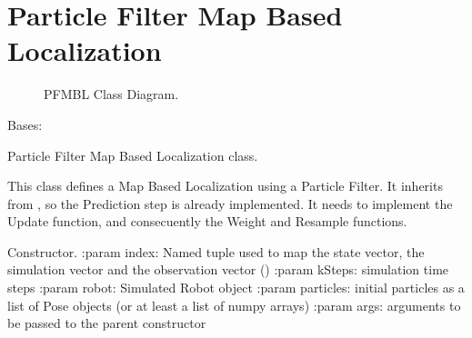 \documentclass[letterpaper,10pt,english]{sphinxmanual}
\begin{document}
\section{Particle Filter Map Based Localization}
\label{\detokenize{particle_filter:particle-filter-map-based-localization}}
\begin{figure}[htbp]
\centering
\capstart

\noindent{}
\caption{PFMBL Class Diagram.}\label{\detokenize{particle_filter:id3}}\end{figure}

\begin{fulllineitems}
\label{\detokenize{particle_filter:PFMBLocalization.PFMBL}}
\sphinxAtStartPar
Bases: {\hyperref[\detokenize{particle_filter:MCLocalization.MCLocalization}]{}}

\sphinxAtStartPar
Particle Filter Map Based Localization class.

\sphinxAtStartPar
This class defines a Map Based Localization using a Particle Filter. It inherits from , so the Prediction step is already implemented.
It needs to implement the Update function, and consecuently the Weight and Resample functions.

\begin{fulllineitems}
\label{\detokenize{particle_filter:PFMBLocalization.PFMBL.__init__}}
\sphinxAtStartPar
Constructor.
:param index: Named tuple used to map the state vector, the simulation vector and the observation vector ()
:param kSteps: simulation time steps
:param robot: Simulated Robot object
:param particles: initial particles as a list of Pose objects (or at least a list of numpy arrays)
:param args: arguments to be passed to the parent constructor


\end{fulllineitems}
\end{fulllineitems}
\end{document}
